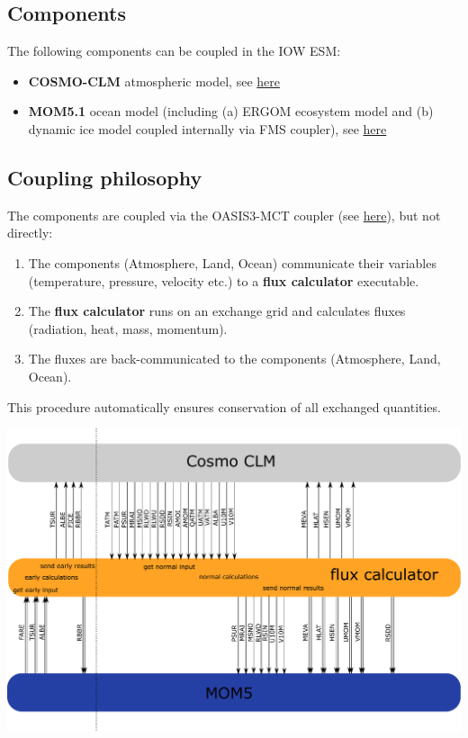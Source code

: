 \documentclass[a4paper,titlepage]{scrartcl}
\begin{document}
\subsection{Components}
The following components can be coupled in the IOW ESM:
\begin{itemize}
\item \textbf{COSMO-CLM} atmospheric model, see \href{https://wiki.coast.hereon.de/clmcom/}{here}
\item \textbf{MOM5.1} ocean model (including (a) ERGOM ecosystem model and (b) dynamic ice model coupled internally via FMS coupler), see \href{https://mom-ocean.github.io/}{here}
\end{itemize}

\subsection{Coupling philosophy}
The components are coupled via the OASIS3-MCT coupler (see \href{https://oasis.cerfacs.fr/en/}{here}), but not directly:
\begin{enumerate}
\item The components (Atmosphere, Land, Ocean) communicate their variables (temperature, pressure, velocity etc.) to a \textbf{flux calculator} executable.
\item The \textbf{flux calculator} runs on an exchange grid and calculates  fluxes (radiation, heat, mass, momentum).
\item The fluxes are back-communicated to the components (Atmosphere, Land, Ocean).
\end{enumerate}
This procedure automatically ensures conservation of all exchanged quantities.

\begin{center}
\includegraphics[scale=0.3]{./figures/sequence-diagram.pdf}
\end{center}
\end{document}
